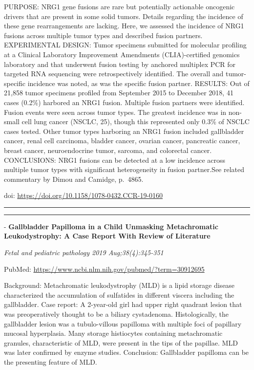 \documentclass[]{article}
\begin{document}
PURPOSE: NRG1 gene fusions are rare but potentially actionable oncogenic
drivers that are present in some solid tumors. Details regarding the
incidence of these gene rearrangements are lacking. Here, we assessed
the incidence of NRG1 fusions across multiple tumor types and described
fusion partners. EXPERIMENTAL DESIGN: Tumor specimens submitted for
molecular profiling at a Clinical Laboratory Improvement Amendments
(CLIA)-certified genomics laboratory and that underwent fusion testing
by anchored multiplex PCR for targeted RNA sequencing were
retrospectively identified. The overall and tumor-specific incidence was
noted, as was the specific fusion partner. RESULTS: Out of 21,858 tumor
specimens profiled from September 2015 to December 2018, 41 cases
(0.2\%) harbored an NRG1 fusion. Multiple fusion partners were
identified. Fusion events were seen across tumor types. The greatest
incidence was in non-small cell lung cancer (NSCLC, 25), though this
represented only 0.3\% of NSCLC cases tested. Other tumor types
harboring an NRG1 fusion included gallbladder cancer, renal cell
carcinoma, bladder cancer, ovarian cancer, pancreatic cancer, breast
cancer, neuroendocrine tumor, sarcoma, and colorectal cancer.
CONCLUSIONS: NRG1 fusions can be detected at a low incidence across
multiple tumor types with significant heterogeneity in fusion
partner.See related commentary by Dimou and Camidge, p.~4865.

doi: \url{https://doi.org/10.1158/1078-0432.CCR-19-0160}

{}

{}

\begin{center}\rule{0.5\linewidth}{\linethickness}\end{center}

\begin{center}\rule{0.5\linewidth}{\linethickness}\end{center}

 - \textbf{Gallbladder Papilloma in a Child Unmasking Metachromatic
Leukodystrophy: A Case Report With Review of Literature}

\emph{Fetal and pediatric pathology 2019 Aug;38(4):345-351}

PubMed: \url{https://www.ncbi.nlm.nih.gov/pubmed/?term=30912695}

Background: Metachromatic leukodystrophy (MLD) is a lipid storage
disease characterized the accumulation of sulfatides in different
viscera including the gallbladder. Case report: A 2-year-old girl had
upper right quadrant lesion that was preoperatively thought to be a
biliary cystadenoma. Histologically, the gallbladder lesion was a
tubulo-villous papilloma with multiple foci of papillary mucosal
hyperplasia. Many storage histiocytes containing metachromatic granules,
characteristic of MLD, were present in the tips of the papillae. MLD was
later confirmed by enzyme studies. Conclusion: Gallbladder papilloma can
be the presenting feature of MLD.
\end{document}
